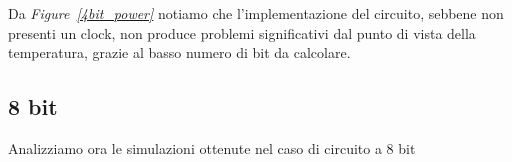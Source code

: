 Da \textit{Figure~\ref{4bit_power}} notiamo che l'implementazione del circuito, sebbene non presenti un clock, non produce problemi significativi dal punto di vista della temperatura, grazie al basso numero di bit da calcolare.
\FloatBarrier

\subsection{8 bit}
Analizziamo ora le simulazioni ottenute nel caso di circuito a 8 bit

